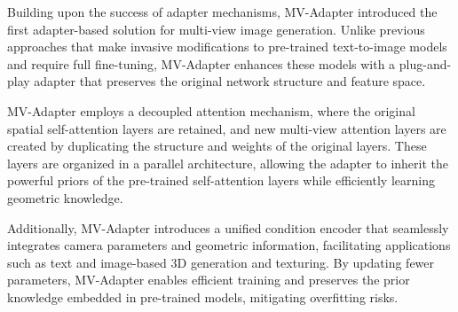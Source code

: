 Building upon the success of adapter mechanisms, MV-Adapter \cite{mvadapter} introduced the first adapter-based solution for multi-view image generation. Unlike previous approaches that make invasive modifications to pre-trained text-to-image models and require full fine-tuning, MV-Adapter enhances these models with a plug-and-play adapter that preserves the original network structure and feature space.

MV-Adapter employs a decoupled attention mechanism, where the original spatial self-attention layers are retained, and new multi-view attention layers are created by duplicating the structure and weights of the original layers. These layers are organized in a parallel architecture, allowing the adapter to inherit the powerful priors of the pre-trained self-attention layers while efficiently learning geometric knowledge.

Additionally, MV-Adapter introduces a unified condition encoder that seamlessly integrates camera parameters and geometric information, facilitating applications such as text and image-based 3D generation and texturing. By updating fewer parameters, MV-Adapter enables efficient training and preserves the prior knowledge embedded in pre-trained models, mitigating overfitting risks.